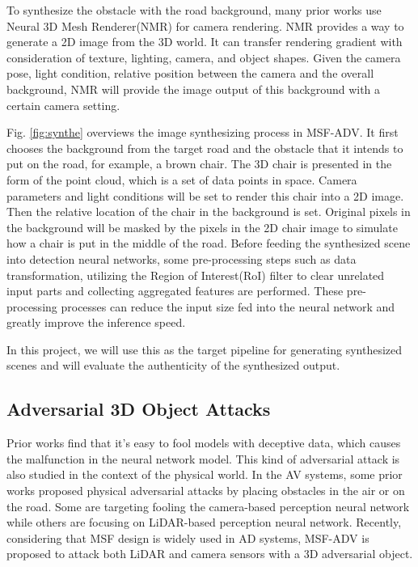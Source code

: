 To synthesize the obstacle with the road background, many prior works\cite{msf-adv} use Neural 3D Mesh Renderer(NMR) for camera rendering\cite{nmr}.
NMR provides a way to generate a 2D image from the 3D world. 
It can transfer rendering gradient with consideration of texture, lighting, camera, and object shapes.
Given the camera pose, light condition, relative position between the camera and the overall background, 
NMR will provide the image output of this background with a certain camera setting. 

Fig. \ref{fig:synthe} overviews the image synthesizing process in MSF-ADV\cite{msf-adv}.
It first chooses the background from the target road and the obstacle that it intends to put on the road, for example, a brown chair.
The 3D chair is presented in the form of the point cloud, which is a set of data points in space.
Camera parameters and light conditions will be set to render this chair into a 2D image. 
Then the relative location of the chair in the background is set. 
Original pixels in the background will be masked by the pixels in the 2D chair image to simulate how a chair is put in the middle of the road.
Before feeding the synthesized scene into detection neural networks, some pre-processing steps such as data transformation,
utilizing the Region of Interest(RoI) filter to clear unrelated input parts and collecting aggregated features are performed.
These pre-processing processes can reduce the input size fed into the neural network and greatly improve the inference speed.

In this project, we will use this as the target pipeline for generating synthesized scenes and will evaluate the authenticity of the synthesized output.


\subsection{Adversarial 3D Object Attacks}

Prior works find that it's easy to fool models with deceptive data, which causes the malfunction in the neural network model.
This kind of adversarial attack is also studied in the context of the physical world\cite{adv1, adv2, adv3}.
In the AV systems, some prior works proposed physical adversarial attacks by placing obstacles in the air or on the road\cite{adv1, adv2, adv3}.
Some are targeting fooling the camera-based perception neural network\cite{adv1, adv2, adv3} while others are focusing on LiDAR-based perception neural network\cite{lidar1, 6}.
Recently, considering that MSF design is widely used in AD systems, MSF-ADV\cite{msf-adv} is proposed to attack both LiDAR and camera sensors with a 3D adversarial object.

